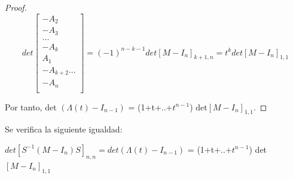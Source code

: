 \begin{lem}
\begin{proof}
	           \[det\begin{bmatrix}
	           -A_{2}  \\
	           -A_{3} \\
	           ... \\
	           -A_{k}\\
	           A_{1}\\
	           -A_{k+2}
	           ...\\	
	           - A_{n} \\
	           \end{bmatrix}=(-1)^{n-k-1}det[M-I_{n}]_{k+1,n} = t^{k}det[M-I_{n}]_{1,1}\]
	           
	           Por tanto, det $(\Lambda(t) - I_{n-1})$ = (1+t+..+$ t^{n-1} $) det$[ M - I_{n}] _{1,1} $.
	 \end{proof}
 \end{lem}
 

 \begin{cor}\label{corlem}
 		Se verifica la siguiente igualdad:
 		\begin{center}
 			$ det[S^{-1}(M-I_{n})S]_{n,n} = det(\Lambda(t)-I_{n-1}) $ = (1+t+..+$ t^{n-1} $) det$[ M - I_{n}] _{1,1} $
 		\end{center}
 \end{cor}
 
